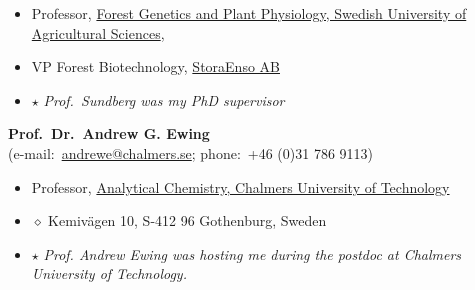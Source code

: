 \documentclass[10pt]{article}
\newenvironment{innerlist}[1][\enskip\textbullet]%
                                                                            {\begin{itemize}[#1,leftmargin=*,parsep=0pt,itemsep=0pt,topsep=0pt,partopsep=0pt]}
                                                                            {\end{itemize}}
\newcommand{\halfblankline}{\quad\vspace{-0.5\baselineskip}\pagebreak[3]}
\begin{document}
                                                                                           \begin{innerlist}
                                                                                               \item Professor,
                                                                                                   \href{http://www.slu.se/}{Forest Genetics and Plant Physiology,
                                                                                                        Swedish University of Agricultural Sciences},
                                                                                               \item VP Forest Biotechnology,
                                                                                                   \href{http://storaenso.com/}{StoraEnso AB}
                                                                                               \item[$\star$] \emph{Prof.~Sundberg was my PhD supervisor}
                                                                                           \end{innerlist}

                                                                                           \halfblankline

                                                                                           {\textbf{Prof.~Dr.~Andrew G. Ewing}} \\
                                                                                           (e-mail:~\href{mailto:andrewe@chalmers.se}{andrewe@chalmers.se}; phone:~+46 (0)31 786 9113)
                                                                                           \begin{innerlist}
                                                                                           \item Professor,
                                                                                             \href{http://www.chalmers.se/en/staff/Pages/andrew-ewing.aspx}{Analytical Chemistry,
                                                                                               Chalmers University of Technology}
                                                                                           \item[$\diamond$] Kemiv\"{a}gen 10, S-412 96 Gothenburg, Sweden
                                                                                           \item[$\star$] \emph{Prof. Andrew Ewing was hosting me during the postdoc at
                                                                                             Chalmers University of Technology.}
                                                                                           \end{innerlist}
\end{document}
